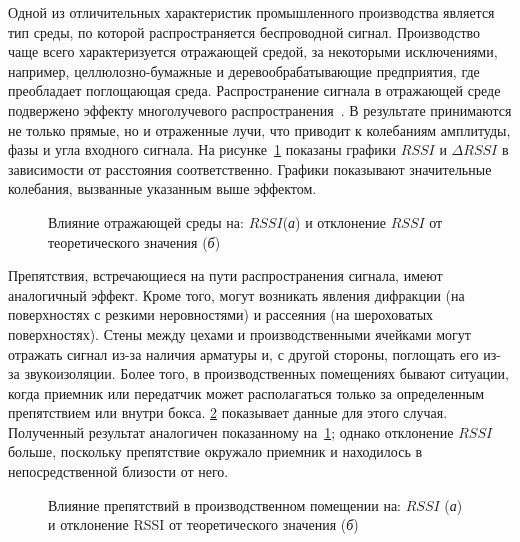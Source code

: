 Одной из отличительных характеристик промышленного производства является тип среды, по которой распространяется беспроводной сигнал. Производство чаще всего характеризуется отражающей средой, за некоторыми исключениями, например, целлюлозно-бумажные и деревообрабатывающие предприятия, где преобладает поглощающая среда. Распространение сигнала в отражающей среде подвержено эффекту многолучевого распространения~\cite{7433518}. В результате принимаются не только прямые, но и отраженные лучи, что приводит к колебаниям амплитуды, фазы и угла входного сигнала. На рисунке~\cref{ch-3/fig-5} показаны графики $RSSI$ и $\Delta RSSI$ в зависимости от расстояния соответственно. Графики показывают значительные колебания, вызванные указанным выше эффектом.

\begin{figure} [tb]
	\caption[Влияние отражающей среды на: $RSSI$ и отклонение $RSSI$ от теоретического значения]{Влияние отражающей среды на: $RSSI$(\textit{а}) и отклонение $RSSI$ от теоретического значения (\textit{б})}
	\label{ch-3/fig-5}
\end{figure}

Препятствия, встречающиеся на пути распространения сигнала, имеют аналогичный эффект. Кроме того, могут возникать явления дифракции (на поверхностях с резкими неровностями) и рассеяния (на шероховатых поверхностях). Стены между цехами и производственными ячейками могут отражать сигнал из-за наличия арматуры и, с другой стороны, поглощать его из-за звукоизоляции. Более того, в производственных помещениях бывают ситуации, когда приемник или передатчик может располагаться только за определенным препятствием или внутри бокса. \cref{ch-3/fig-6} показывает данные для этого случая. Полученный результат аналогичен показанному на~\cref{ch-3/fig-5}; однако отклонение $RSSI$ больше, поскольку препятствие окружало приемник и находилось в непосредственной близости от него.

\begin{figure} [tb]
	\caption[Влияние препятствий в производственном помещении на: RSSI и отклонение RSSI от теоретического значения)]{Влияние препятствий в производственном помещении на: $RSSI$ (\textit{а}) и отклонение RSSI от теоретического значения (\textit{б})}
	\label{ch-3/fig-6}
\end{figure}

